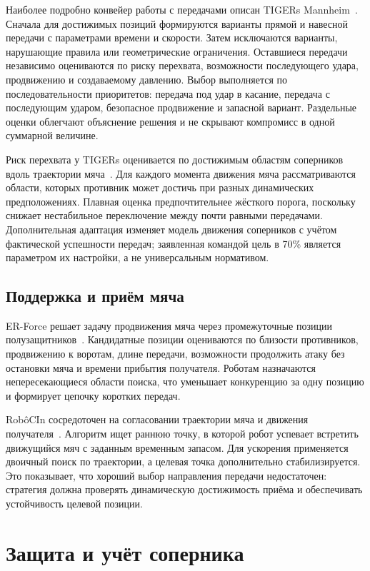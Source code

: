 \documentclass{misisarticle}
\begin{document}
Наиболее подробно конвейер работы с передачами описан TIGERs Mannheim~\cite{tigers2025}. Сначала для достижимых позиций формируются варианты прямой и навесной передачи с параметрами времени и скорости. Затем исключаются варианты, нарушающие правила или геометрические ограничения. Оставшиеся передачи независимо оцениваются по риску перехвата, возможности последующего удара, продвижению и создаваемому давлению. Выбор выполняется по последовательности приоритетов: передача под удар в касание, передача с последующим ударом, безопасное продвижение и запасной вариант. Раздельные оценки облегчают объяснение решения и не скрывают компромисс в одной суммарной величине.

Риск перехвата у TIGERs оценивается по достижимым областям соперников вдоль траектории мяча~\cite{tigers2025,tigerscode}. Для каждого момента движения мяча рассматриваются области, которых противник может достичь при разных динамических предположениях. Плавная оценка предпочтительнее жёсткого порога, поскольку снижает нестабильное переключение между почти равными передачами. Дополнительная адаптация изменяет модель движения соперников с учётом фактической успешности передач; заявленная командой цель в 70\% является параметром их настройки, а не универсальным нормативом.

\subsection{Поддержка и приём мяча}

ER-Force решает задачу продвижения мяча через промежуточные позиции полузащитников~\cite{erforce2019}. Кандидатные позиции оцениваются по близости противников, продвижению к воротам, длине передачи, возможности продолжить атаку без остановки мяча и времени прибытия получателя. Роботам назначаются непересекающиеся области поиска, что уменьшает конкуренцию за одну позицию и формирует цепочку коротких передач.

RobôCIn сосредоточен на согласовании траектории мяча и движения получателя~\cite{robocin2025}. Алгоритм ищет раннюю точку, в которой робот успевает встретить движущийся мяч с заданным временным запасом. Для ускорения применяется двоичный поиск по траектории, а целевая точка дополнительно стабилизируется. Это показывает, что хороший выбор направления передачи недостаточен: стратегия должна проверять динамическую достижимость приёма и обеспечивать устойчивость целевой позиции.

\section{Защита и учёт соперника}
\end{document}
